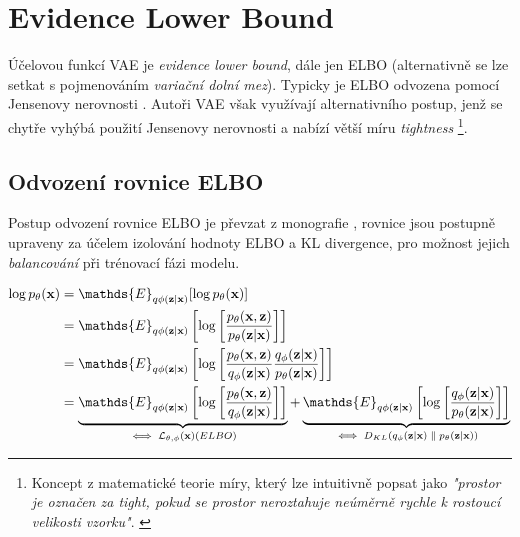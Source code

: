 \newpage
\section{Evidence Lower Bound}
\label{sec:vae_objective}
Účelovou funkcí VAE je \emph{evidence lower bound}, dále jen ELBO (alternativně se lze setkat s pojmenováním \emph{variační dolní mez}).
Typicky je ELBO odvozena pomocí Jensenovy nerovnosti \cite[Sekce 4.2]{Wasserman2013}.
Autoři VAE \cite{Kingma2014} však využívají alternativního postup, jenž se chytře vyhýbá použití Jensenovy nerovnosti a nabízí větší míru \emph{tightness}
\footnote{Koncept z matematické teorie míry, který lze intuitivně popsat jako \emph{"prostor je označen za tight, pokud se prostor neroztahuje neúměrně rychle k rostoucí velikosti vzorku"}. \cite{Topsoee1974}}. 

\subsection{Odvození rovnice ELBO}
Postup odvození rovnice ELBO je převzat z monografie \textcite{Kingma2019}, rovnice jsou postupně upraveny za účelem izolování hodnoty ELBO a KL divergence, pro možnost jejich \emph{balancování} při trénovací fázi modelu.

\begin{align}
    \log p_\theta(\textbf{x}) &= \mathds{E}_{q\phi(\textbf{z}\mid\textbf{x})}[\log p_\theta(\textbf{x})] \\
                              &= \mathds{E}_{q\phi(\textbf{z}\mid\textbf{x})} \left[ \log \left[ \frac{p_\theta(\textbf{x}, \textbf{z})}{p_\theta(\textbf{z}\mid\textbf{x})} \right] \right] \\
                              &= \mathds{E}_{q\phi(\textbf{z}\mid\textbf{x})} \left[ \log \left[ \frac{p_\theta(\textbf{x}, \textbf{z})}{q_\phi(\textbf{z}\mid\textbf{x})} \frac{q_\phi(\textbf{z}\mid\textbf{x})}{p_\theta(\textbf{z}\mid\textbf{x})} \right] \right] \\
                              &= \underbrace{ \mathds{E}_{q\phi(\textbf{z}\mid\textbf{x})} \left[ \log \left[ \frac{p_\theta(\textbf{x}, \textbf{z})}{q_\phi(\textbf{z}\mid\textbf{x})} \right] \right] }_\text{$ \iff \mathcal{L}_{\theta,\phi}(\textbf{x}) (ELBO)$} 
                              +  \underbrace{ \mathds{E}_{q\phi(\textbf{z}\mid\textbf{x})} \left[ \log \left[ \frac{q_\phi(\textbf{z}\mid\textbf{x})}{p_\theta(\textbf{z}\mid\textbf{x})} \right] \right] }_\text{$\iff D_{KL}(q_\phi(\textbf{z}\mid\textbf{x})\parallel p_\theta(\textbf{z}\mid\textbf{x}))$} \\ \label{eq:elbo_kl}
\end{align}

